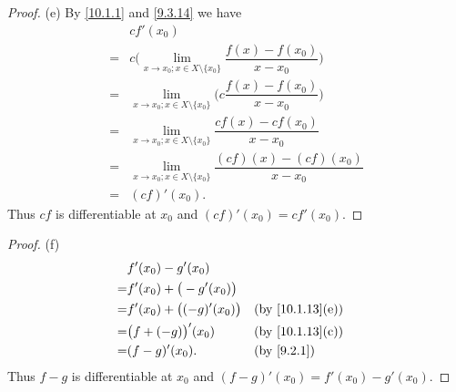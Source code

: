 \begin{proof}{(e)}
  By \cref{10.1.1} and \cref{9.3.14} we have
  \begin{align*}
      & cf'(x_0)                                                                                  \\
    = & c \bigg(\lim_{x \to x_0 ; x \in X \setminus \{x_0\}} \dfrac{f(x) - f(x_0)}{x - x_0}\bigg) \\
    = & \lim_{x \to x_0 ; x \in X \setminus \{x_0\}} \bigg(c \dfrac{f(x) - f(x_0)}{x - x_0}\bigg) \\
    = & \lim_{x \to x_0 ; x \in X \setminus \{x_0\}} \dfrac{cf(x) - cf(x_0)}{x - x_0}             \\
    = & \lim_{x \to x_0 ; x \in X \setminus \{x_0\}} \dfrac{(cf)(x) - (cf)(x_0)}{x - x_0}         \\
    = & (cf)'(x_0).
  \end{align*}
  Thus \(cf\) is differentiable at \(x_0\) and \((cf)'(x_0) = cf'(x_0)\).
\end{proof}

\begin{proof}{(f)}
  \begin{align*}
      & f'(x_0) - g'(x_0)                                                 \\
    = & f'(x_0) + \big(-g'(x_0)\big)                                      \\
    = & f'(x_0) + \big((-g)'(x_0)\big) &  & \text{(by \cref{10.1.13}(e))} \\
    = & \big(f + (-g)\big)'(x_0)       &  & \text{(by \cref{10.1.13}(c))} \\
    = & (f - g)'(x_0).                 &  & \by{9.2.1}
  \end{align*}
  Thus \(f - g\) is differentiable at \(x_0\) and \((f - g)'(x_0) = f'(x_0) - g'(x_0)\).
\end{proof}

